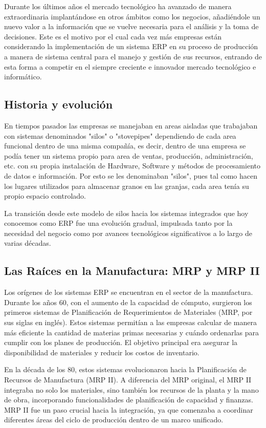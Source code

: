 \documentclass[12pt,letterpaper,spanish]{report}
\begin{document}
Durante los últimos años el mercado tecnológico ha avanzado de manera extraordinaria implantándose en otros ámbitos como los negocios, añadiéndole un nuevo valor a la información que se vuelve necesaria para el análisis y la toma de decisiones. Este es el motivo por el cual cada vez más empresas están considerando la implementación de un sistema ERP en su proceso de producción a manera de sistema central para el manejo y gestión de sus recursos, entrando de esta forma a competir en el siempre creciente e innovador mercado tecnológico e informático. 

\subsection{Historia y evolución}
En tiempos pasados las empresas se manejaban en areas aisladas que trabajaban con sistemas denominados "silos" o "stovepipes" dependiendo de cada area funcional dentro de una misma compañía, es decir, dentro de una empresa se podía tener un sistema propio para area de ventas, producción, administración, etc. con su propia instalación de Hardware, Software y métodos de procesamiento de datos e información. Por esto se les denominaban "silos", pues tal como hacen los lugares utilizados para almacenar granos en las granjas, cada area tenía su propio espacio controlado.

La transición desde este modelo de silos hacia los sistemas integrados que hoy conocemos como ERP fue una evolución gradual, impulsada tanto por la necesidad del negocio como por avances tecnológicos significativos a lo largo de varias décadas.

\subsection{Las Raíces en la Manufactura: MRP y MRP II}
Los orígenes de los sistemas ERP se encuentran en el sector de la manufactura. Durante los años 60, con el aumento de la capacidad de cómputo, surgieron los primeros sistemas de Planificación de Requerimientos de Materiales (MRP, por sus siglas en inglés). Estos sistemas permitían a las empresas calcular de manera más eficiente la cantidad de materias primas necesarias y cuándo ordenarlas para cumplir con los planes de producción. El objetivo principal era asegurar la disponibilidad de materiales y reducir los costos de inventario.

En la década de los 80, estos sistemas evolucionaron hacia la Planificación de Recursos de Manufactura (MRP II). A diferencia del MRP original, el MRP II integraba no solo los materiales, sino también los recursos de la planta y la mano de obra, incorporando funcionalidades de planificación de capacidad y finanzas. MRP II fue un paso crucial hacia la integración, ya que comenzaba a coordinar diferentes áreas del ciclo de producción dentro de un marco unificado.
\end{document}
